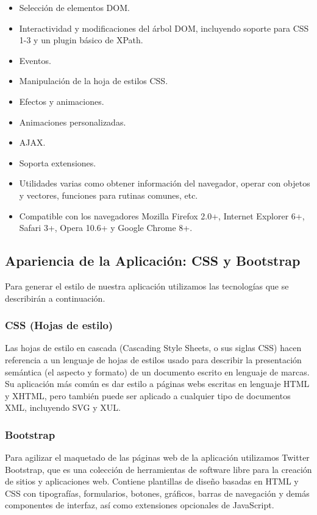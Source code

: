 \begin{itemize}
  \item Selección de elementos DOM.
  \item Interactividad y modificaciones del árbol DOM, incluyendo soporte para CSS 1-3 y un plugin básico de XPath.
  \item Eventos.
  \item Manipulación de la hoja de estilos CSS.
  \item Efectos y animaciones.
  \item Animaciones personalizadas.
  \item AJAX.
  \item Soporta extensiones.
  \item Utilidades varias como obtener información del navegador, operar con objetos y vectores, funciones para rutinas comunes, etc.
  \item Compatible con los navegadores Mozilla Firefox 2.0+, Internet Explorer 6+, Safari 3+, Opera 10.6+ y Google Chrome 8+.
\end{itemize}

\subsection{Apariencia de la Aplicación: CSS y Bootstrap}


Para generar el estilo de nuestra aplicación utilizamos las tecnologías que se describirán a continuación.\\

\subsubsection{CSS (Hojas de estilo)}
Las hojas de estilo en cascada (Cascading Style Sheets, o sus siglas CSS) hacen referencia a un 
lenguaje de hojas de estilos usado para describir la presentación semántica (el aspecto y formato) de un 
documento escrito en lenguaje de marcas. Su aplicación más común es dar estilo a páginas webs escritas en lenguaje HTML y XHTML, 
pero también puede ser aplicado a cualquier tipo de documentos XML, incluyendo SVG y XUL.

\subsubsection{Bootstrap}
Para agilizar el maquetado de las páginas web de la aplicación utilizamos Twitter Bootstrap, que es una colección de herramientas de software
libre para la creación de sitios y aplicaciones web. Contiene plantillas de diseño basadas en HTML y CSS con tipografías, 
formularios, botones, gráficos, barras de navegación y demás componentes de interfaz, así como extensiones opcionales de JavaScript.

